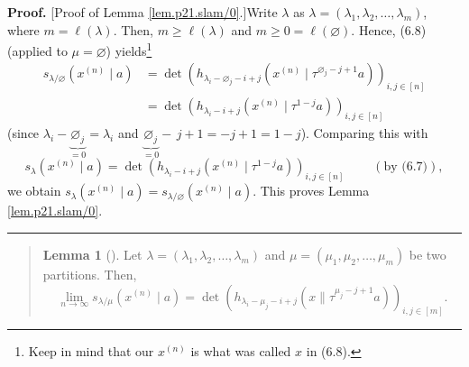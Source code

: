 \documentclass[numbers=enddot,12pt,final,onecolumn,notitlepage]{scrartcl}%
\newenvironment{statement}{\begin{quote}}{\end{quote}}
\theoremstyle{definition}
\newtheorem{lem}[theo]{Lemma}
\newenvironment{lemmain}[1][]
{\begin{statement}\begin{lem}[#1]}
{\end{lem}\end{statement}}
\newenvironment{proof}[1][Proof]{\noindent\textbf{#1.} }{\ \rule{0.5em}{0.5em}}
\newenvironment{lemmain}[1][Proof]{\noindent\textbf{#1.} }{\ \rule{0.5em}{0.5em}}
\begin{document}
\begin{enumerate}
\begin{proof}
[Proof of Lemma \ref{lem.p21.slam/0}.]Write $\lambda$ as $\lambda=\left(
\lambda_{1},\lambda_{2},\ldots,\lambda_{m}\right)  $, where $m=\ell\left(
\lambda\right)  $. Then, $m\geq\ell\left(  \lambda\right)  $ and $m\geq
0=\ell\left(  \varnothing\right)  $. Hence, (6.8) (applied to $\mu
=\varnothing$) yields\footnote{Keep in mind that our $x^{\left(  n\right)  }$
is what was called $x$ in (6.8).}
\begin{align*}
s_{\lambda/\varnothing}\left(  x^{\left(  n\right)  }\mid a\right)   &
=\det\left(  h_{\lambda_{i}-\varnothing_{j}-i+j}\left(  x^{\left(  n\right)
}\mid\tau^{\varnothing_{j}-j+1}a\right)  \right)  _{i,j\in\left[  n\right]
}\\
&  =\det\left(  h_{\lambda_{i}-i+j}\left(  x^{\left(  n\right)  }\mid
\tau^{1-j}a\right)  \right)  _{i,j\in\left[  n\right]  }%
\end{align*}
(since $\lambda_{i}-\underbrace{\varnothing_{j}}_{=0}=\lambda_{i}$ and
$\underbrace{\varnothing_{j}}_{=0}-\,j+1=-j+1=1-j$). Comparing this with%
\[
s_{\lambda}\left(  x^{\left(  n\right)  }\mid a\right)  =\det\left(
h_{\lambda_{i}-i+j}\left(  x^{\left(  n\right)  }\mid\tau^{1-j}a\right)
\right)  _{i,j\in\left[  n\right]  }\ \ \ \ \ \ \ \ \ \ \left(  \text{by
(6.7)}\right)  ,
\]
we obtain $s_{\lambda}\left(  x^{\left(  n\right)  }\mid a\right)
=s_{\lambda/\varnothing}\left(  x^{\left(  n\right)  }\mid a\right)  $. This
proves Lemma \ref{lem.p21.slam/0}.
\end{proof}

\begin{lemmain}
\label{lem.p21.slam/mu=det}Let $\lambda=\left(  \lambda_{1},\lambda_{2}%
,\ldots,\lambda_{m}\right)  $ and $\mu=\left(  \mu_{1},\mu_{2},\ldots,\mu
_{m}\right)  $ be two partitions. Then,%
\[
\lim\limits_{n\rightarrow\infty}s_{\lambda/\mu}\left(  x^{\left(  n\right)
}\mid a\right)  =\det\left(  h_{\lambda_{i}-\mu_{j}-i+j}\left(  x\parallel
\tau^{\mu_{j}-j+1}a\right)  \right)  _{i,j\in\left[  m\right]  }.
\]

\end{lemmain}


\end{enumerate}
\end{document}
